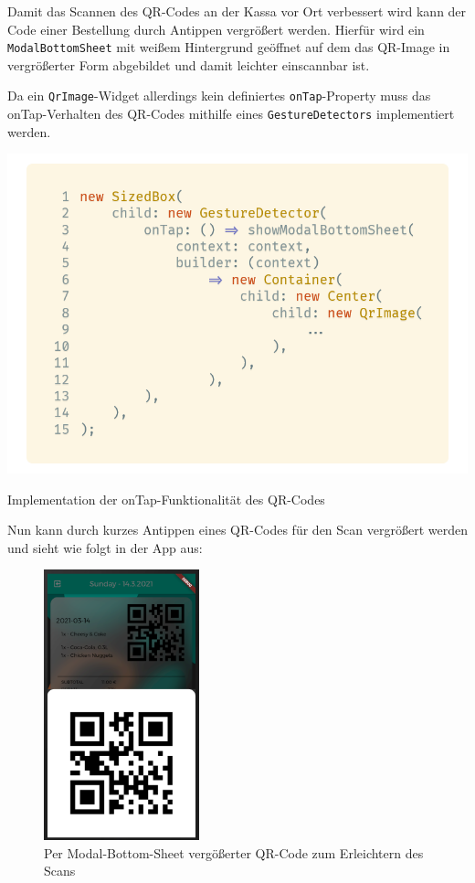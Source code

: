 Damit das Scannen des QR-Codes an der Kassa vor Ort verbessert wird kann der Code einer Bestellung
durch Antippen vergrößert werden. Hierfür wird ein \lstinline{ModalBottomSheet} mit weißem Hintergrund
geöffnet auf dem das QR-Image in vergrößerter Form abgebildet und damit leichter einscannbar ist.

Da ein \lstinline{QrImage}-Widget allerdings kein definiertes \lstinline{onTap}-Property muss
das onTap-Verhalten des QR-Codes mithilfe eines \lstinline{GestureDetectors} implementiert werden.

\begin{code}[H]
    \centering
    \includegraphics[width=1\textwidth]{images/Client/views/orderview/gesturedetector.png}
    \vspace{-20pt}
    \caption{Implementation der onTap-Funktionalität des QR-Codes}
    \label{gesturedetector}
\end{code}

\newpage

Nun kann durch kurzes Antippen eines QR-Codes für den Scan vergrößert werden und sieht wie folgt
in der App aus:

\begin{figure}[H]
    \centering
    \includegraphics[width=0.40\textwidth]{images/Client/views/orderview/qrcode.png}
    \caption{Per Modal-Bottom-Sheet vergößerter QR-Code zum Erleichtern des Scans}
\end{figure}

